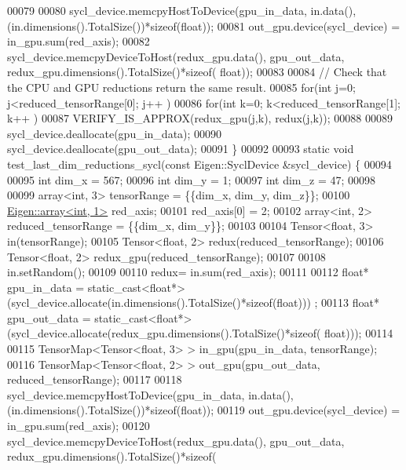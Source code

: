 \begin{DoxyCode}
00079 
00080   sycl\_device.memcpyHostToDevice(gpu\_in\_data, in.data(),(in.dimensions().TotalSize())*\textcolor{keyword}{sizeof}(\textcolor{keywordtype}{float}));
00081   out\_gpu.device(sycl\_device) = in\_gpu.sum(red\_axis);
00082   sycl\_device.memcpyDeviceToHost(redux\_gpu.data(), gpu\_out\_data, redux\_gpu.dimensions().TotalSize()*\textcolor{keyword}{sizeof}(
      float));
00083 
00084   \textcolor{comment}{// Check that the CPU and GPU reductions return the same result.}
00085   \textcolor{keywordflow}{for}(\textcolor{keywordtype}{int} j=0; j<reduced\_tensorRange[0]; j++ )
00086     \textcolor{keywordflow}{for}(\textcolor{keywordtype}{int} k=0; k<reduced\_tensorRange[1]; k++ )
00087       VERIFY\_IS\_APPROX(redux\_gpu(j,k), redux(j,k));
00088 
00089   sycl\_device.deallocate(gpu\_in\_data);
00090   sycl\_device.deallocate(gpu\_out\_data);
00091 \}
00092 
00093 \textcolor{keyword}{static} \textcolor{keywordtype}{void} test\_last\_dim\_reductions\_sycl(\textcolor{keyword}{const} Eigen::SyclDevice &sycl\_device) \{
00094 
00095   \textcolor{keywordtype}{int} dim\_x = 567;
00096   \textcolor{keywordtype}{int} dim\_y = 1;
00097   \textcolor{keywordtype}{int} dim\_z = 47;
00098 
00099   array<int, 3> tensorRange = \{\{dim\_x, dim\_y, dim\_z\}\};
00100   \hyperlink{class_eigen_1_1array}{Eigen::array<int, 1>} red\_axis;
00101   red\_axis[0] = 2;
00102   array<int, 2> reduced\_tensorRange = \{\{dim\_x, dim\_y\}\};
00103 
00104   Tensor<float, 3> in(tensorRange);
00105   Tensor<float, 2> redux(reduced\_tensorRange);
00106   Tensor<float, 2> redux\_gpu(reduced\_tensorRange);
00107 
00108   in.setRandom();
00109 
00110   redux= in.sum(red\_axis);
00111 
00112   \textcolor{keywordtype}{float}* gpu\_in\_data = \textcolor{keyword}{static\_cast<}\textcolor{keywordtype}{float}*\textcolor{keyword}{>}(sycl\_device.allocate(in.dimensions().TotalSize()*\textcolor{keyword}{sizeof}(float)))
      ;
00113   \textcolor{keywordtype}{float}* gpu\_out\_data = \textcolor{keyword}{static\_cast<}\textcolor{keywordtype}{float}*\textcolor{keyword}{>}(sycl\_device.allocate(redux\_gpu.dimensions().TotalSize()*\textcolor{keyword}{sizeof}(
      float)));
00114 
00115   TensorMap<Tensor<float, 3> >  in\_gpu(gpu\_in\_data, tensorRange);
00116   TensorMap<Tensor<float, 2> >  out\_gpu(gpu\_out\_data, reduced\_tensorRange);
00117 
00118   sycl\_device.memcpyHostToDevice(gpu\_in\_data, in.data(),(in.dimensions().TotalSize())*\textcolor{keyword}{sizeof}(\textcolor{keywordtype}{float}));
00119   out\_gpu.device(sycl\_device) = in\_gpu.sum(red\_axis);
00120   sycl\_device.memcpyDeviceToHost(redux\_gpu.data(), gpu\_out\_data, redux\_gpu.dimensions().TotalSize()*\textcolor{keyword}{sizeof}(

\end{DoxyCode}
